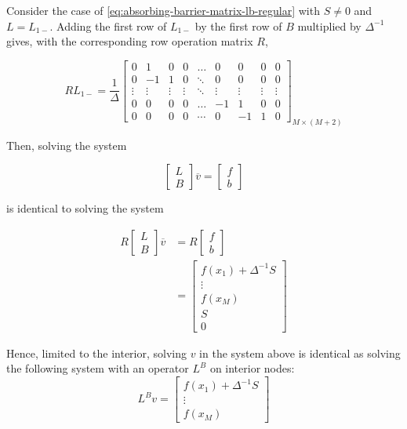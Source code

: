\documentclass[11pt]{article}
\theoremstyle{definition}
\begin{document}
Consider the case of \cref{eq:absorbing-barrier-matrix-lb-regular} with $S\neq 0$ and $L = L_{1-}$. Adding the first row of $L_{1-}$ by the first row of $B$ multiplied by $\Delta^{-1}$ gives, with the corresponding row operation matrix $R$, 

\begin{equation}
RL_{1-} = \frac{1}{\Delta}\begin{bmatrix}
0&1&0&0&\dots&0&0&0&0\\
0&-1&1&0&\ddots&0&0&0&0\\
\vdots&\vdots&\vdots&\vdots&\ddots&\vdots&\vdots&\vdots&\vdots\\
0&0&0&0&\dots&-1&1&0&0\\
0&0&0&0&\cdots&0&-1&1&0
\end{bmatrix}_{M\times (M+2)}
\end{equation}


Then, solving the system 

\begin{equation}
\begin{bmatrix}
 L \\
 B
\end{bmatrix} 
\overline{v}
=
\begin{bmatrix}
f \\
b
\end{bmatrix}
\end{equation}

is identical to solving the system

\begin{align}
R\begin{bmatrix}
 L \\
 B
\end{bmatrix} 
\overline{v}
&= 
R\begin{bmatrix}
f \\
b
\end{bmatrix} \\
&= \begin{bmatrix}
 f(x_1) + \Delta^{-1}S \\
 \vdots \\
 f(x_M) \\
 S \\
 0
\end{bmatrix}
\end{align}

Hence, limited to the interior, solving $v$ in the system above is identical as solving the following system with an operator $L^B$ on interior nodes:
\begin{equation}
L^Bv=\begin{bmatrix}
f(x_1) + \Delta^{-1}S\\
\vdots \\
f(x_M)
\end{bmatrix}
\end{equation}
\end{document}
